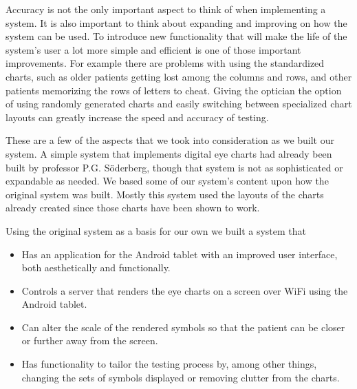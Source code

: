 \documentclass[12pt,a4paper,notitlepage]{report}
\begin{document}
Accuracy is not the only important aspect to think of when implementing a system. It is also important to think about expanding and improving on how the system can be used. To introduce new functionality that will make the life of the system's user a lot more simple and efficient is one of those important improvements. For example there are problems with using the standardized charts, such as older patients getting lost among the columns and rows, and other patients memorizing the rows of letters to cheat. Giving the optician the option of using randomly generated charts and easily switching between specialized chart layouts can greatly increase the speed and accuracy of testing.

These are a few of the aspects that we took into consideration as we built our system. A simple system that implements digital eye charts had already been built by professor P.G. Söderberg, though that system is not as sophisticated or expandable as needed. We based some of our system's content upon how the original system was built. Mostly this system used the layouts of the charts already created since those charts have been shown to work. 

Using the original system as a basis for our own we built a system that

\begin{itemize}
	\item Has an application for the Android tablet with an improved user interface, both aesthetically and functionally.
	\item Controls a server that renders the eye charts on a screen over WiFi using the Android tablet.
	\item Can alter the scale of the rendered symbols so that the patient can be closer or further away from the screen.
	\item Has functionality to tailor the testing process by, among other things, changing the sets of symbols displayed or removing clutter from the charts.
\end{itemize}

\end{document}
